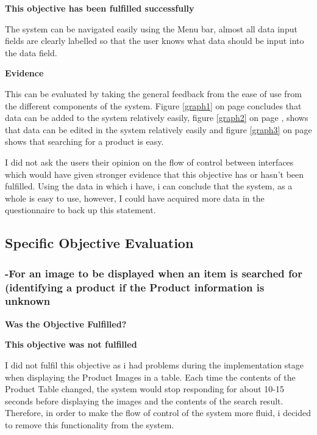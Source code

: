 \textbf{\large{This objective has been fulfilled successfully}}

The system can be navigated easily using the Menu bar, almost all data input fields are clearly labelled so that the user knows what data should be input into the data field.

\textbf{Evidence} \newline

This can be evaluated by taking the general feedback from the ease of use from the different components of the system. Figure \ref{graph1} on page \pageref{page1} concludes that data can be added to the system relatively easily, figure \ref{graph2} on page \pageref{graph2}, shows that data can be edited in the system relatively easily and figure \ref{graph3} on page \pageref{graph3} shows that searching for a product is easy.

I did not ask the users their opinion on the flow of control between interfaces which would have given stronger evidence that this objective has or hasn't been fulfilled. Using the data in which i have, i can conclude that the system, as a whole is easy to use, however, I could have acquired more data in the questionnaire to back up this statement. 

\pagebreak
\subsection{Specific Objective Evaluation}



\subsubsection{-For an image to be displayed when an item is searched for (identifying a product if the Product information is unknown}
\textbf{Was the Objective Fulfilled?} \newline


\textbf{\large{This objective was not fulfilled}}

I did not fulfil this objective as i had problems during the implementation stage when displaying the Product Images in a table. Each time the contents of the Product Table changed, the system would stop responding for about 10-15 seconds before displaying the images and the contents of the search result. Therefore, in order to make the flow of control of the system more fluid, i decided to remove this functionality from the system. \newline

